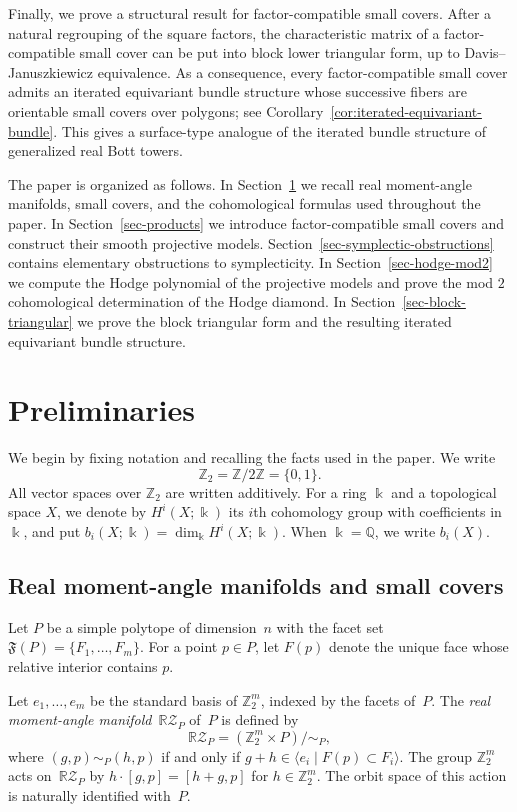\documentclass{amsart}
\numberwithin{equation}{section}
\theoremstyle{definition}
\theoremstyle{remark}
\newcommand{\Z}{\mathbb Z}
\newcommand{\Q}{\mathbb Q}
\newcommand{\fF}{\mathfrak F}
\newcommand{\RZ}{\mathbb R\mathcal Z}
\newcommand{\field}{\Bbbk}
\begin{document}
Finally, we prove a structural result for factor-compatible small covers. 
After a natural regrouping of the square factors, the characteristic matrix of a factor-compatible small cover can be put into block lower triangular form, up to Davis--Januszkiewicz equivalence. 
As a consequence, every factor-compatible small cover admits an iterated equivariant bundle structure whose successive fibers are orientable small covers over polygons; see Corollary~\ref{cor:iterated-equivariant-bundle}.
This gives a surface-type analogue of the iterated bundle structure of generalized real Bott towers.

The paper is organized as follows. 
In Section~\ref{sec-preliminaries} we recall real moment-angle manifolds, small covers, and the cohomological formulas used throughout the paper. 
In Section~\ref{sec-products} we introduce factor-compatible small covers and construct their smooth projective models. 
Section~\ref{sec-symplectic-obstructions} contains elementary obstructions to symplecticity. 
In Section~\ref{sec-hodge-mod2} we compute the Hodge polynomial of the projective models and prove the mod $2$ cohomological determination of the Hodge diamond.
In Section~\ref{sec-block-triangular} we prove the block triangular form and the resulting iterated equivariant bundle structure.



\section{Preliminaries}\label{sec-preliminaries}

We begin by fixing notation and recalling the facts used in the paper.
We write
$$
    \Z_2=\Z/2\Z=\{0,1\}.
$$
All vector spaces over $\Z_2$ are written additively.
For a ring $\field$ and a topological space $X$, we denote by $H^i(X;\field)$ its $i$th cohomology group with coefficients in~$\field$, and 
put $b_i(X;\field)=\dim_\field H^i(X;\field)$.
When $\field=\Q$, we write $b_i(X)$.


\subsection{Real moment-angle manifolds and small covers}

Let $P$ be a simple polytope of dimension~$n$ with the facet set $\fF(P)=\{F_1,\ldots,F_m\}$.
For a point $p \in P$, let $F(p)$ denote the unique face whose relative interior contains $p$.

Let $e_1,\ldots,e_m$ be the standard basis of $\Z_2^m$, indexed by the facets of~$P$.
The \emph{real moment-angle manifold}~$\RZ_P$ of~$P$ is defined by
$$
    \RZ_P=(\Z_2^m\times P)/\sim_P,
$$
where $(g,p)\sim_P(h,p)$ if and only if $g+h\in \langle e_i\mid F(p)\subset F_i\rangle$.
The group $\Z_2^m$ acts on~$\RZ_P$ by $h\cdot[g,p]=[h+g,p]$ for $h \in \Z_2^m$.
The orbit space of this action is naturally identified with~$P$.
\end{document}
